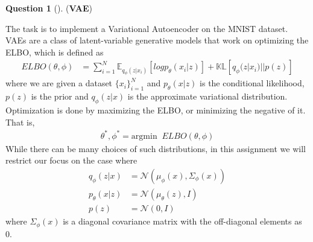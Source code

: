 \documentclass[12pt]{article}
\theoremstyle{definition}
\newtheorem{exercise}{Question}%
\begin{document}
\begin{exercise}[] (\textbf{VAE}) 

The task is to implement a Variational Autoencoder on the MNIST dataset. VAEs are a class of latent-variable generative models that work on optimizing the ELBO, which is defined as
\begin{align*}
    ELBO(\theta, \phi) &= \sum_{i=1}^N\mathbb{E}_{q_\phi(z|x_i)} [log p_\theta(x_i | z)] + \mathbb{KL}[q_\phi(z | x_i) || p(z)]
\end{align*}
where we are given a dataset $\{x_i\}_{i=1}^N$ and $p_\theta(x|z)$ is the conditional likelihood, $p(z)$ is the prior and $q_\phi(z|x)$ is the approximate variational distribution. Optimization is done by maximizing the ELBO, or minimizing the negative of it. That is,
\begin{align*}
    \theta^*, \phi^* = \text{argmin}\;\; ELBO(\theta, \phi)
\end{align*}
While there can be many choices of such distributions, in this assignment we will restrict our focus on the case where 
\begin{align*}
    q_\phi(z|x) &= \mathcal{N}(\mu_\phi(x), \Sigma_\phi(x)) \\
    p_\theta(x|z) &= \mathcal{N}(\mu_\theta(z), I) \\
    p(z) &= \mathcal{N}(0, I)
\end{align*}
where $\Sigma_\phi(x)$ is a diagonal covariance matrix with the off-diagonal elements as 0.


\end{exercise}
\end{document}
